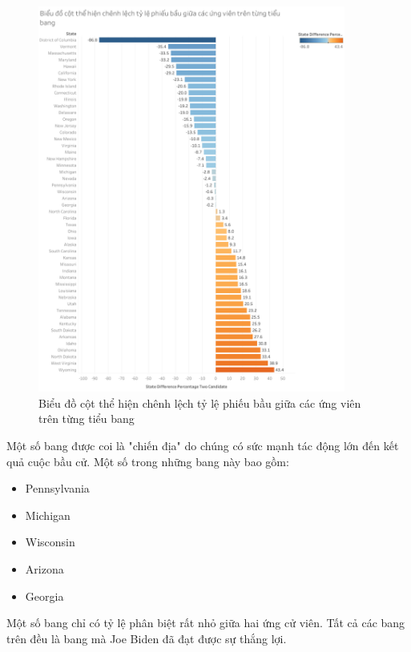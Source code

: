 \documentclass[14pt, a4paper]{article}
\numberwithin{equation}{section}
\numberwithin{figure}{section}
\numberwithin{dl}{section}
\numberwithin{md}{section}
\numberwithin{bd}{section}
\numberwithin{dn}{section}
\numberwithin{hq}{section}
\begin{document}
    \begin{figure}[h!]
        \centering
        \includegraphics[width=0.9\textwidth]{figures/State_Difference_Percentage_Total_Vote_Two_Candidate_Bar_Chart.png}
        \caption{Biểu đồ cột thể hiện chênh lệch tỷ lệ phiếu bầu giữa các ứng viên trên từng tiểu bang}
    \end{figure}

    Một số bang được coi là "chiến địa" do chúng có sức mạnh tác động lớn đến kết quả cuộc bầu cử. 
    Một số trong những bang này bao gồm:

    \begin{itemize}
        \item Pennsylvania
        \item Michigan
        \item Wisconsin
        \item Arizona
        \item Georgia
    \end{itemize}

    Một số bang chỉ có tỷ lệ phân biệt rất nhỏ giữa hai ứng cử viên.
    Tất cả các bang trên đều là bang mà Joe Biden đã đạt được sự thắng lợi.
\end{document}
